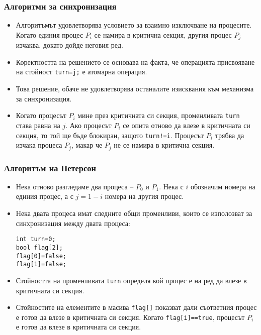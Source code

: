 \documentclass[ignorenonframetext, hyperref=unicode]{beamer}
\begin{document}
\begin{frame}[containsverbatim]
\frametitle{Алгоритми за синхронизация}
\begin{itemize}
\item Алгоритъмът удовлетворява условието за взаимно изключване на процесите.
Когато единия процес $P_i$ се намира в критична секция, другия процес $P_j$
изчаква, докато дойде неговия ред.
\item Коректността на решението се основава на факта, че операцията присвояване
на стойност \lstinline{turn=j;} е атомарна операция.
\item Това решение, обаче не удовлетворява останалите изисквания към механизма
за синхронизация. 
\item Когато процесът $P_i$ мине през критичната си секция, променливата
\lstinline{turn} става равна на $j$. Ако процесът $P_i$ се опита отново да влезе
в критичната си секция, то той ще бъде блокиран, защото \lstinline{turn!=i}.
Процесът $P_i$ трябва да изчака процеса $P_j$, макар че $P_j$ не се намира в
критична секция.
\end{itemize}
\end{frame}


\begin{frame}[containsverbatim]
\frametitle{Алгоритъм на Петерсон}
\begin{itemize}
\item Нека отново разгледаме два процеса -- $P_0$ и $P_1$. Нека с $i$ обозначим
  номера на единия процес, а с $j=1-i$ номера на другия процес.
\item Нека двата процеса имат следните общи променливи, които се изполозват за
  синхронизация между двата процеса: 
\begin{lstlisting}[numbers=none]
int turn=0;
bool flag[2];
flag[0]=false;
flag[1]=false;
\end{lstlisting}
\item Стойността на променливата \lstinline{turn} определя кой процес е на ред
  да влезе в критичната си секция.
\item Стойностите на елементите в масива \lstinline{flag[]}  показват дали
  съответния процес е готов да влезе в критичната си секция. Когато
  \lstinline{flag[i]==true}, процесът $P_i$ е готов да влезе в критичната си секция.
\end{itemize}
\end{frame}
\end{document}
